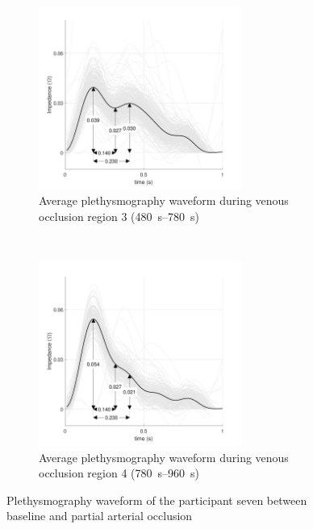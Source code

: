 \begin{figure}[!htbp]
	\centering
	\begin{subfigure}[t]{0.48\textwidth}
		\centering
		\includegraphics[height=6cm]{figure8a}
		\caption{Average plethysmography waveform during venous occlusion region 3 (\SIrange{480}{780}{\second})}
		\label{fig:iPG_arterial_baseline}
	\end{subfigure}%
	~ 
	\begin{subfigure}[t]{0.48\textwidth}
		\centering
		\includegraphics[height=6cm]{figure8b}
		\caption{Average plethysmography waveform during venous occlusion region 4 (\SIrange{780}{960}{\second})}
		\label{fig:iPG_arterial_occlusion}
	\end{subfigure}
	\caption{Plethysmography waveform of the participant seven between baseline and partial arterial occlusion}
	\label{fig:iPG_arterial}
\end{figure}

